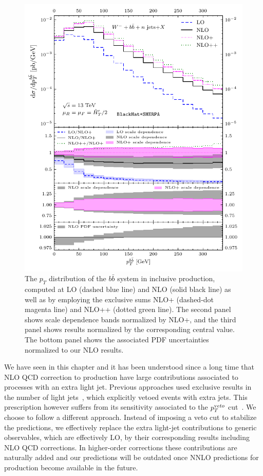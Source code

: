 \begin{figure}[t]
\centering
\includegraphics[clip,scale=1]{plots/excl_ptbb_v4}
\caption{The $p_T$ distribution of the $b\bar{b}$ system in inclusive \Wbbm{} production,
    computed at LO (dashed blue line) and NLO (solid black line) as well as
    by employing the exclusive sums NLO+ (dashed-dot magenta line)
    and NLO++ (dotted green line). The second panel shows scale dependence bands normalized by NLO+,
    and the third panel shows results normalized by the corresponding
    central value. The bottom panel shows the associated PDF uncertainties
    normalized to our NLO results.}
  \label{fig_Wmnjptbb}
\end{figure}

We have seen in this chapter and it has been understood since a long time that NLO QCD correction to \Wbb{} production have large contributions associated to
processes with an extra light jet. Previous approaches used
exclusive results in the number of light jets~\cite{FebresCordero:2006sj}, which explicitly vetoed
events with extra jets. This prescription however suffers from its sensitivity
associated to the $p_T^{\textrm veto}$ cut~\cite{Tackmann:2012bt}. We choose to follow a different approach. Instead of imposing a veto cut to stabilize the predictions, we
effectively replace the extra light-jet contributions to generic observables,
which are effectively LO, by their corresponding results including NLO QCD
corrections. In higher-order corrections these contributions are naturally
added and our predictions will be outdated once NNLO predictions for \Wbb{} production become available in the future.


